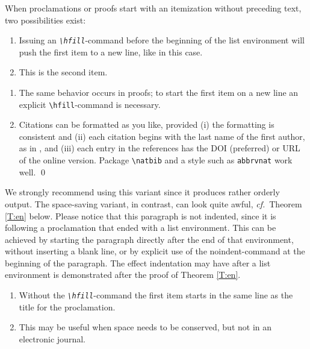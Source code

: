 \documentclass{jpc} %
\theoremstyle{plain}\newtheorem{satz}[thm]{Satz} %
\def\cf{{\em cf.}}
\begin{document}
  When proclamations or proofs start with an itemization without
  preceding text, two possibilities exist:

\begin{thm}\label{T:m}\hfill  %
\begin{enumerate}
\item
  Issuing an {\em\texttt{\textbackslash hfill}}-command before the
  beginning of the list environment will push the first item to a new
  line, like in this case.
\item
  This is the second item.
\end{enumerate}
\end{thm}

\proof\hfill  %
\begin{enumerate}
\item
  The same behavior occurs in proofs; to start the first item on a
  new line an explicit \texttt{\textbackslash hfill}-command is necessary.
\item
	Citations can be formatted as you like, provided (i) the formatting is consistent and (ii) each citation begins with the last name of the first author, as in \cite{Abowd:Nissim:Skinner:2009}, and (iii) each entry in the references has the DOI (preferred) or URL of the online version. Package \texttt{\textbackslash natbib} and a style such as \texttt{abbrvnat} work well. \qed
\end{enumerate}

  \noindent We strongly recommend using this variant since it produces
  rather orderly output.  The space-saving variant, in contrast, can
  look quite awful, \cf~Theorem \ref{T:en} below.  Please notice that
  this paragraph is not indented, since it is following a proclamation
  that ended with a list environment.  This can be achieved by
  starting the paragraph directly after the end of that environment,
  without inserting a blank line, or by explicit use of the
  noindent-command at the beginning of the paragraph.  The effect
  indentation may have after a list environment is demonstrated after
  the proof of Theorem \ref{T:en}.

\begin{thm}\label{T:en} %

\begin{enumerate}%
\item
  Without the \emph{\texttt{\textbackslash hfill}}-command the first item
  starts in the same line as the title for the proclamation.
\item
  This may be useful when space needs to be conserved, but not in an
  electronic journal.
\end{enumerate}
\end{thm}
\end{document}
